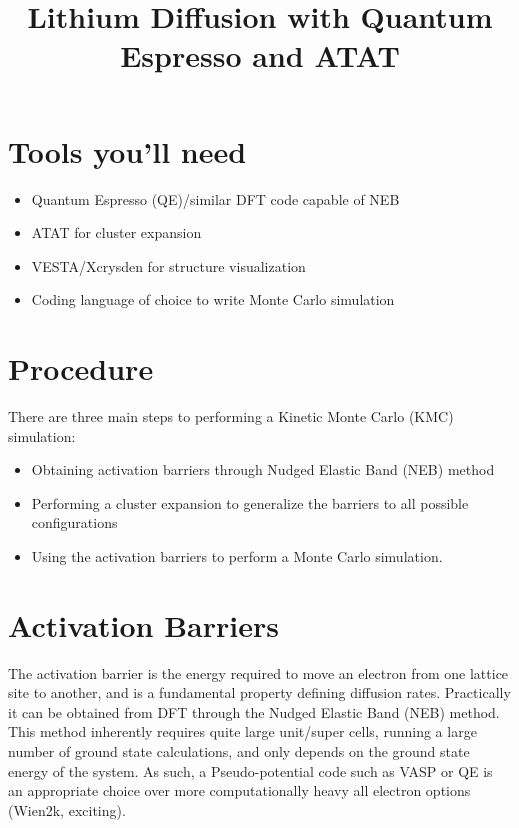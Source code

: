 \documentclass[12pt]{article}
\title{Lithium Diffusion with Quantum Espresso and ATAT}
\begin{document}
\maketitle

\tableofcontents


\section{Tools you'll need}

\begin{itemize}
	\item Quantum Espresso (QE)/similar DFT code capable of NEB
	
	\item ATAT for cluster expansion
	
	\item VESTA/Xcrysden for structure visualization 
	
	\item Coding language of choice to write Monte Carlo simulation
\end{itemize}

\section{Procedure}

There are three main steps to performing a Kinetic Monte Carlo (KMC) simulation:
\begin{itemize}
	\item  Obtaining activation barriers through Nudged Elastic Band (NEB) method 
	\item  Performing a cluster expansion to generalize the barriers to all possible configurations
	\item Using the activation barriers to perform a Monte Carlo simulation.
\end{itemize}


\section{Activation Barriers}
The activation barrier is the energy required to move an electron from one lattice site to another, and is a fundamental property defining diffusion rates.  Practically it can be obtained from DFT through the Nudged Elastic Band (NEB) method.  This method inherently requires quite large unit/super cells, running a large number of ground state calculations, and only depends on the ground state energy of the system.  As such, a Pseudo-potential code such as VASP or QE is an appropriate choice over more computationally heavy all electron options (Wien2k, exciting).  \\
\end{document}

